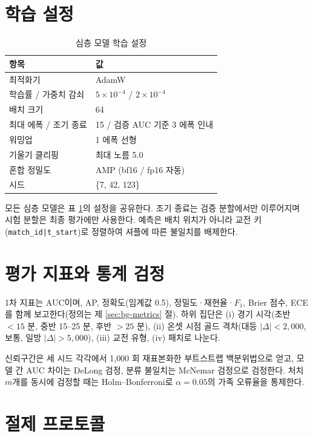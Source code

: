 \section{학습 설정}
\label{sec:setup-training}

\begin{table}[htbp]
  \centering
  \caption{심층 모델 학습 설정}
  \label{tab:training}
  \small
  \begin{tabular}{@{}ll@{}}
    \toprule
    항목 & 값 \\
    \midrule
    최적화기 & AdamW \cite{loshchilov2019decoupled} \\
    학습률 / 가중치 감쇠 & $5\times 10^{-4}$ / $2\times 10^{-4}$ \\
    배치 크기 & 64 \\
    최대 에폭 / 조기 종료 & 15 / 검증 AUC 기준 3 에폭 인내 \\
    워밍업 & 1 에폭 선형 \\
    기울기 클리핑 & 최대 노름 5.0 \\
    혼합 정밀도 & AMP (bf16 / fp16 자동) \\
    시드 & \{7, 42, 123\} \\
    \bottomrule
  \end{tabular}
\end{table}

모든 심층 모델은 표 \ref{tab:training}의 설정을 공유한다. 조기 종료는 검증 분할에서만 이루어지며 시험 분할은 최종 평가에만 사용한다. 예측은 배치 위치가 아니라 교전 키(\texttt{match\_id|t\_start})로 정렬하여 셔플에 따른 불일치를 배제한다.

\section{평가 지표와 통계 검정}
\label{sec:setup-metrics}

1차 지표는 AUC이며, AP, 정확도(임계값 0.5), 정밀도·재현율·$F_1$, Brier 점수, ECE를 함께 보고한다(정의는 제 \ref{sec:bg-metrics} 절). 하위 집단은 (i) 경기 시각(초반 $<15$ 분, 중반 15--25 분, 후반 $>25$ 분), (ii) 온셋 시점 골드 격차(대등 $|\Delta| < 2{,}000$, 보통, 일방 $|\Delta| > 5{,}000$), (iii) 교전 유형, (iv) 패치로 나눈다.

신뢰구간은 세 시드 각각에서 1{,}000 회 재표본화한 부트스트랩 백분위법으로 얻고, 모델 간 AUC 차이는 DeLong 검정, 분류 불일치는 McNemar 검정으로 검정한다. 처치 $m$개를 동시에 검정할 때는 Holm--Bonferroni로 $\alpha = 0.05$의 가족 오류율을 통제한다.

\section{절제 프로토콜}
\label{sec:setup-ablation}

